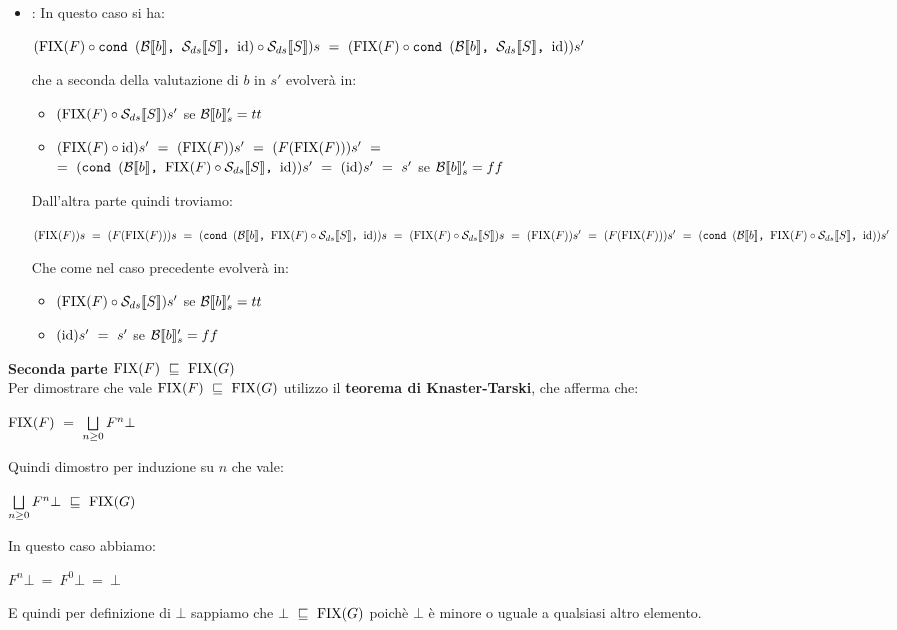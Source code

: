 {\begin{itemize}
\begin{itemize}
			\item {}: In questo caso si ha:
			\begin{center}
			$(\fixp{F} \circ \cond{b}{\Sds{}}{\idDS} \circ{} \Sds{})s~=~
			(\fixp{F} \circ \cond{b}{\Sds{}}{\idDS})s'$
			\end{center}
			che a seconda della valutazione di $b$ in $s'$ evolverà in:
			\begin{itemize}
			\item $(\fixp{F} \circ \Sds{})s'$ se $\evalBbs{b}{s'}=tt$
			\item $(\fixp{F} \circ \idDS)s'~=~(\fixp{F})s'~=~(F(\fixp{F}))s'~=
			$\\$=~(\cond{b}{\fixp{F} \circ{} \Sds{}}{\idDS})s'~=~(\idDS{})s'~=~s'$
			se $\evalBbs{b}{s'}=ff$
			\end{itemize}
			Dall'altra parte quindi troviamo:
			\begin{center}
			$(\fixp{F})s~=~(F(\fixp{F}))s~=~(\cond{b}{\fixp{F} \circ{} 
			\Sds{}}{\idDS})s~=~(\fixp{F} \circ{} \Sds{})s~=~(\fixp{F})s'~=~
			(F(\fixp{F}))s'~=~(\cond{b}{\fixp{F} \circ{} \Sds{}}{\idDS})s'$
			\end{center}
			Che come nel caso precedente evolverà in:
			\begin{itemize}
			\item $(\fixp{F} \circ \Sds{})s'$ se $\evalBbs{b}{s'}=tt$
			\item $(\idDS{})s'~=~s'$ se $\evalBbs{b}{s'}=ff$
			\end{itemize}
		\end{itemize}
	\end{itemize}

	\textbf{Seconda parte $\fixp{F}~\mineq~\fixp{G}$}\\
	Per dimostrare che vale $\fixp{F}~\mineq~\fixp{G}$ utilizzo il
	\textbf{teorema di Knaster-Tarski}, che afferma che:
	\begin{center}
	$\fixp{F}~=~\unionsem{n}F^{n}\bot$
	\end{center}
	Quindi dimostro per induzione su $n$ che vale:
	\begin{center}
	$\unionsem{n}F^{n}\bot~\mineq~\fixp{G}$
	\end{center}

	 In questo caso abbiamo:
	\begin{center}
	$F^{n}\bot~=~F^{0}\bot~=~\bot$
	\end{center}
	E quindi per definizione di $\bot$ sappiamo che $\bot~\mineq~\fixp{G}$
	poichè $\bot$ è minore o uguale a qualsiasi altro elemento.

}
